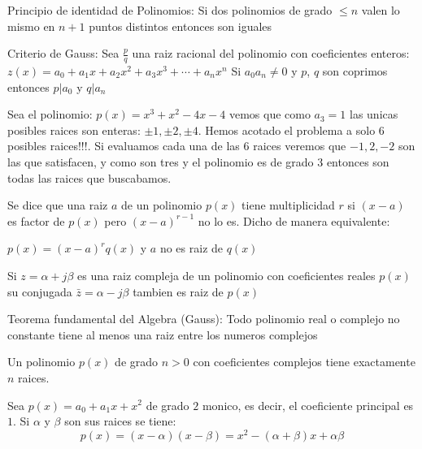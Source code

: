 \begin{teo}{Principio de identidad de Polinomios:}
   Si dos polinomios de grado $\leq n$ valen lo mismo en $n+1$ puntos distintos entonces son iguales
\end{teo}
\begin{teo}{Criterio de Gauss:}
   Sea $\frac{p}{q}$ una raiz racional del polinomio con coeficientes enteros: $z(x) = a_0 + a_1 x + a_2 x^2 + a_3 x^3 + \cdots + a_n x^n$
   Si $a_0 a_n \neq 0$ y $p$, $q$ son coprimos entonces $p|a_0$ y $q|a_n$
\end{teo}

\begin{ejemplo}
   Sea el polinomio: $p(x)=x^{3}+x^{2}-4x-4$ vemos que como $a_{3}=1$ las unicas posibles raices son enteras: $\pm 1, \pm 2, \pm 4$. Hemos acotado el problema
   a solo 6 posibles raices!!!. Si evaluamos cada una de las $6$ raices veremos que $-1, 2, -2$ son las que satisfacen, y como son tres y el polinomio es de
   grado $3$ entonces son todas las raices que buscabamos.
\end{ejemplo}

\begin{defi}
   Se dice que una raiz $a$ de un polinomio $p(x)$ tiene multiplicidad $r$ si $(x-a)$ es factor de $p(x)$ pero $(x-a)^{r-1}$ no lo es. Dicho de manera equivalente:

   $p(x)=(x-a)^{r}q(x)$  y $a$ no es raiz de $q(x)$
\end{defi}

\begin{teo}
   Si $z=\alpha +j\beta$ es una raiz compleja de un polinomio con coeficientes reales $p(x)$ su conjugada $\bar{z}=\alpha-j\beta$ tambien es raiz de $p(x)$
\end{teo}

\begin{teo}{Teorema fundamental del Algebra (Gauss):}
   Todo polinomio real o complejo no constante tiene al menos una raiz entre los numeros complejos
\end{teo}

\begin{coro}
   Un polinomio $p(x)$ de grado $n>0$ con coeficientes complejos tiene exactamente $n$ raices.
\end{coro}

\begin{defi}
   Sea $p(x)=a_0 + a_1 x + x^{2}$ de grado $2$ monico, es decir, el coeficiente principal es $1$. Si $\alpha$ y $\beta$ son sus raices se tiene:
   \begin{equation}
      p(x)=(x-\alpha)(x-\beta)=x^{2}-(\alpha+\beta)x+\alpha \beta
   \end{equation}
\end{defi}
